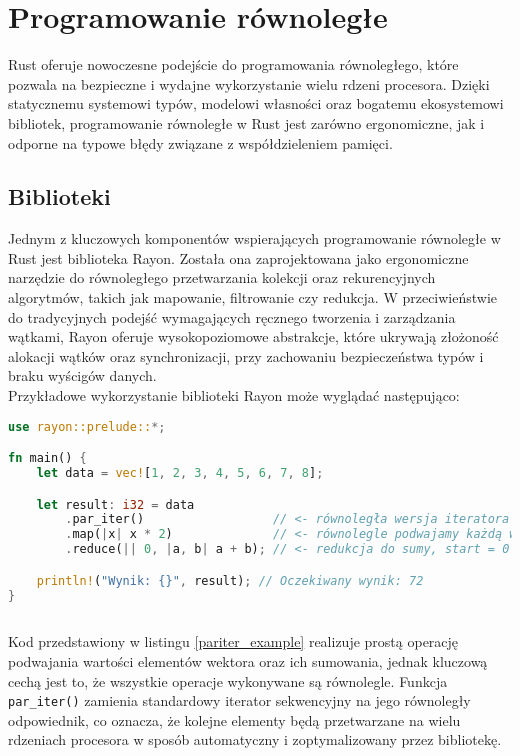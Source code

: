 \section{Programowanie równoległe}
Rust oferuje nowoczesne podejście do programowania równoległego, które pozwala na bezpieczne i wydajne wykorzystanie wielu rdzeni procesora. Dzięki statycznemu systemowi typów, modelowi własności oraz bogatemu ekosystemowi bibliotek, programowanie równoległe w Rust jest zarówno ergonomiczne, jak i odporne na typowe błędy związane z współdzieleniem pamięci.
\subsection{Biblioteki}
Jednym z kluczowych komponentów wspierających programowanie równoległe w Rust jest biblioteka Rayon. Została ona zaprojektowana jako ergonomiczne narzędzie do równoległego przetwarzania kolekcji oraz rekurencyjnych algorytmów, takich jak mapowanie, filtrowanie czy redukcja. W przeciwieństwie do tradycyjnych podejść wymagających ręcznego tworzenia i zarządzania wątkami, Rayon oferuje wysokopoziomowe abstrakcje, które ukrywają złożoność alokacji wątków oraz synchronizacji, przy zachowaniu bezpieczeństwa typów i braku wyścigów danych.\\
Przykładowe wykorzystanie biblioteki Rayon może wyglądać następująco:
\begin{lstlisting}[language=Rust, caption=Przykład użycia par\_iter, label=pariter_example]
use rayon::prelude::*;

fn main() {
    let data = vec![1, 2, 3, 4, 5, 6, 7, 8];

    let result: i32 = data
        .par_iter()                  // <- równoległa wersja iteratora
        .map(|x| x * 2)              // <- równolegle podwajamy każdą wartość
        .reduce(|| 0, |a, b| a + b); // <- redukcja do sumy, start = 0

    println!("Wynik: {}", result); // Oczekiwany wynik: 72
}
    
\end{lstlisting}
Kod przedstawiony w listingu \ref{pariter_example} realizuje prostą operację podwajania wartości elementów wektora oraz ich sumowania, jednak kluczową cechą jest to, że wszystkie operacje wykonywane są równolegle. Funkcja \texttt{par\_iter()} zamienia standardowy iterator sekwencyjny na jego równoległy odpowiednik, co oznacza, że kolejne elementy będą przetwarzane na wielu rdzeniach procesora w sposób automatyczny i zoptymalizowany przez bibliotekę.

